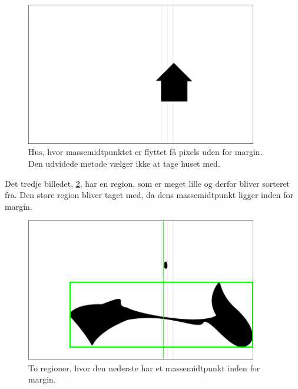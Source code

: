 \begin{figure}[h!!]
	\begin{center}
		\includegraphics[width=0.9\textwidth,angle=0]{afsnit/afprovning/billeder/udvidet_losning/udvidet_hus2_test.png}
	\end{center}
	\caption[]{Hus, hvor massemidtpunktet er flyttet få pixels uden for margin. Den udvidede metode vælger ikke at tage huset med.}
	\label{hus_virker_ikke}
\end{figure}

Det tredje billedet, \ref{udvidet_blob_test}, har en region, som er
meget lille og derfor bliver sorteret fra. Den store region bliver taget
med, da dens massemidtpunkt ligger inden for margin. 

\begin{figure}[h!!]
	\begin{center}
		\includegraphics[width=0.9\textwidth,angle=0]{afsnit/afprovning/billeder/udvidet_losning/udvidet_blob2_test.png}
	\end{center}
	\caption[]{To regioner, hvor den nederste har et massemidtpunkt inden for margin.}
	\label{udvidet_blob_test}
\end{figure}

